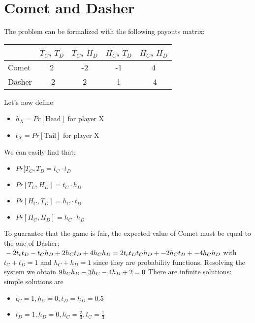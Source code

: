 \section{Comet and Dasher}
The problem can be formalized with the following payouts matrix:
\begin{center}
	\begin{tabular}{l*{4}{c}}
		& $T_C$, $T_D$ & $T_C$, $H_D$ & $H_C$, $T_D$ & $H_C$, $H_D$ \\
		\hline
		Comet & 2 & -2 & -1 & 4 \\
		\hline
		Dasher & -2 & 2 & 1 & -4 \\
	\end{tabular}
	
\end{center}
Let's now define:
\begin{itemize}
\item $h_X = Pr[\text{Head}]$ for player X
\item $t_X = Pr[\text{Tail}]$ for player X
\end{itemize}
We can easily find that:
\begin{itemize}
\item $Pr[T_C, T_D = t_C \cdot t_D$
\item $Pr[T_C, H_D] = t_C \cdot h_D$
\item $Pr[H_C, T_D] = h_C \cdot t_D$
\item $Pr[H_C, H_D] = h_C \cdot h_D$
\end{itemize}
To guarantee that the game is fair, the expected value of Comet must be equal to the one of Dasher:
$\newline\newline-2 t_c t_D -t_C h_D + 2h_C t_D + 4 h_C h_D = 2 t_c t_D t_C h_D + -2h_C t_D + -4 h_C h_D\newline\newline$
with $t_C + t_D = 1$ and $h_C + h_D = 1$ since they are probability functions.
Resolving the system we obtain 
$\newline\newline9h_C h_D -3h_C - 4h_D +2 = 0\newline\newline$
There are infinite solutions: simple solutions are 
\begin{itemize}
	\item $t_C = 1, h_C = 0, t_D = h_D = 0.5$
	\item $t_D = 1, h_D = 0, h_C = \frac{2}{3}, t_C = \frac{1}{3}$	
\end{itemize}
